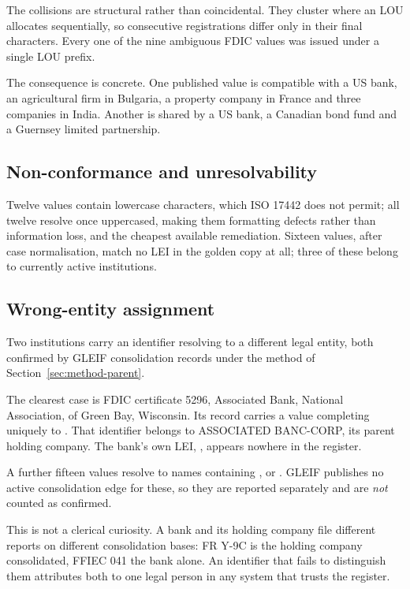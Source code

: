 \documentclass[11pt]{article}
\begin{document}
The collisions are structural rather than coincidental. They cluster where an LOU allocates sequentially, so consecutive registrations differ only in their final characters. Every one of the nine ambiguous FDIC values was issued under a single LOU prefix.

The consequence is concrete. One published value is compatible with a US bank, an agricultural firm in Bulgaria, a property company in France and three companies in India. Another is shared by a US bank, a Canadian bond fund and a Guernsey limited partnership.

\subsection{Non-conformance and unresolvability}
Twelve values contain lowercase characters, which ISO 17442 does not permit; all twelve resolve once uppercased, making them formatting defects rather than information loss, and the cheapest available remediation. Sixteen values, after case normalisation, match no LEI in the golden copy at all; three of these belong to currently active institutions.

\subsection{Wrong-entity assignment}
Two institutions carry an identifier resolving to a different legal entity, both confirmed by GLEIF consolidation records under the method of Section~\ref{sec:method-parent}.

The clearest case is FDIC certificate 5296, Associated Bank, National Association, of Green Bay, Wisconsin. Its record carries a value completing uniquely to . That identifier belongs to ASSOCIATED BANC-CORP, its parent holding company. The bank's own LEI, , appears nowhere in the register.

A further fifteen values resolve to names containing ,  or . GLEIF publishes no active consolidation edge for these, so they are reported separately and are \emph{not} counted as confirmed.

This is not a clerical curiosity. A bank and its holding company file different reports on different consolidation bases: FR Y-9C is the holding company consolidated, FFIEC 041 the bank alone. An identifier that fails to distinguish them attributes both to one legal person in any system that trusts the register.
\end{document}
